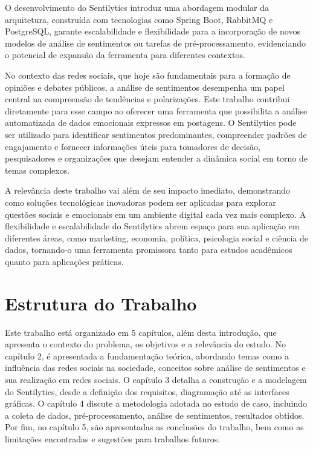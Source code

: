 \documentclass[
	12pt,				%
	oneside,			%
	a4paper,			%
	english,			%
	french,				%
	spanish,			%
	brazil				%
	]{abntex2}
\begin{document}
O desenvolvimento do Sentilytics introduz uma abordagem modular da
arquitetura, construída com tecnologias como Spring Boot, RabbitMQ e
PostgreSQL, garante escalabilidade e flexibilidade para a incorporação
de novos modelos de análise de sentimentos ou tarefas de
pré-processamento, evidenciando o potencial de expansão da ferramenta
para diferentes contextos.

No contexto das redes sociais, que hoje são fundamentais para a formação
de opiniões e debates públicos, a análise de sentimentos desempenha um
papel central na compreensão de tendências e polarizações. Este trabalho
contribui diretamente para esse campo ao oferecer uma ferramenta que
possibilita a análise automatizada de dados emocionais expressos em
postagens. O Sentilytics pode ser utilizado para identificar sentimentos
predominantes, compreender padrões de engajamento e fornecer informações
úteis para tomadores de decisão, pesquisadores e organizações que
desejam entender a dinâmica social em torno de temas complexos.

A relevância deste trabalho vai além de seu impacto imediato,
demonstrando como soluções tecnológicas inovadoras podem ser aplicadas
para explorar questões sociais e emocionais em um ambiente digital cada
vez mais complexo. A flexibilidade e escalabilidade do Sentilytics abrem
espaço para sua aplicação em diferentes áreas, como marketing, economia,
política, psicologia social e ciência de dados, tornando-o uma
ferramenta promissora tanto para estudos acadêmicos quanto para
aplicações práticas.

\hypertarget{estrutura-do-trabalho}{%
\section{Estrutura do Trabalho}\label{estrutura-do-trabalho}}

Este trabalho está organizado em 5 capítulos, além desta introdução, que
apresenta o contexto do problema, os objetivos e a relevância do estudo.
No capítulo 2, é apresentada a fundamentação teórica, abordando temas
como a influência das redes sociais na sociedade, conceitos sobre
análise de sentimentos e sua realização em redes sociais. O capítulo 3
detalha a construção e a modelagem do Sentilytics, desde a definição dos
requisitos, diagramação até as interfaces gráficas. O capítulo 4 discute
a metodologia adotada no estudo de caso, incluindo a coleta de dados,
pré-processamento, análise de sentimentos, resultados obtidos. Por fim,
no capítulo 5, são apresentadas as conclusões do trabalho, bem como as
limitações encontradas e sugestões para trabalhos futuros.
\end{document}
